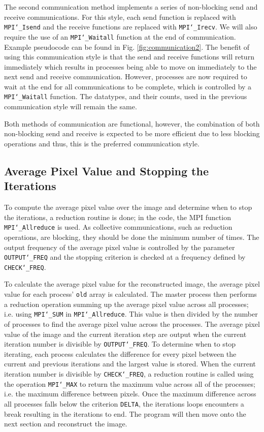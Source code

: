 \documentclass[11pt, a4paper]{article}
\begin{document}
			The second communication method implements a series of non-blocking send and receive communications. For this style, each send function is replaced with \texttt{MPI\char`_Isend} and the receive functions are replaced with \texttt{MPI\char`_Irecv}. We will also require the use of an \texttt{MPI\char`_Waitall} function at the end of communication. Example pseudocode can be found in Fig. \ref{fig:communication2}. The benefit of using this communication style is that the send and receive functions will return immediately which results in processes being able to move on immediately to the next send and receive communication. However, processes are now required to wait at the end for all communications to be complete, which is controlled by a \texttt{MPI\char`_Waitall} function. The datatypes, and their counts, used in the previous communication style will remain the same. 
			

			
			Both methods of communication are functional, however, the combination of both non-blocking send and receive is expected to be more efficient due to less blocking operations and thus, this is the preferred communication style.
			
		\subsection{Average Pixel Value and Stopping the Iterations}
			To compute the average pixel value over the image and determine when to stop the iterations, a reduction routine is done; in the code, the MPI function \texttt{MPI\char`_Allreduce} is used. As collective communications, such as reduction operations, are blocking, they should be done the minimum number of times. The output frequency of the average pixel value is controlled by the parameter \texttt{OUTPUT\char`_FREQ} and the stopping criterion is checked at a frequency defined by \texttt{CHECK\char`_FREQ}.
			
			To calculate the average pixel value for the reconstructed image, the average pixel value for each process' \texttt{old} array is calculated. The master process then performs a reduction operation summing up the average pixel value across all processes; i.e. using \texttt{MPI\char`_SUM} in \texttt{MPI\char`_Allreduce}. This value is then divided by the number of processes to find the average pixel value across the processes. The average pixel value of the image and the current iteration step are output when the current iteration number is divisible by \texttt{OUTPUT\char`_FREQ}. To determine when to stop iterating, each process calculates the difference for every pixel between the current and previous iterations and the largest value is stored. When the current iteration number is divisible by \texttt{CHECK\char`_FREQ}, a reduction routine is called using the operation \texttt{MPI\char`_MAX} to return the maximum value across all of the processes; i.e. the maximum difference between pixels. Once the maximum difference across all processes falls below the criterion \texttt{DELTA}, the iterations loops encounters a break resulting in the iterations to end. The program will then move onto the next section and reconstruct the image.
			
\end{document}
